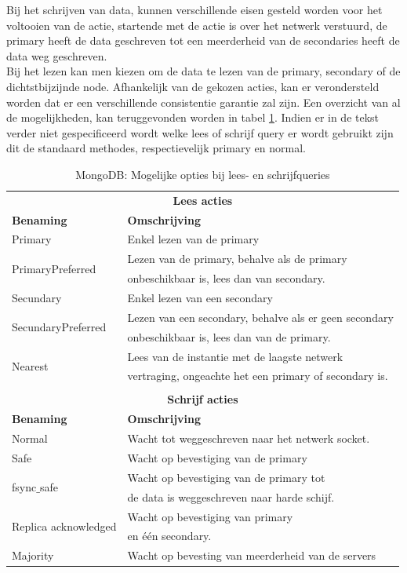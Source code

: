 Bij het schrijven van data, kunnen verschillende eisen gesteld worden voor het voltooien van de actie, startende met de actie is over het netwerk verstuurd, de primary heeft de data geschreven tot een meerderheid van de secondaries heeft de data weg geschreven. \\ Bij het lezen kan men kiezen om de data te lezen van de primary, secondary of de dichtstbijzijnde node. Afhankelijk van de gekozen acties, kan er verondersteld worden dat er een verschillende consistentie garantie zal zijn. Een overzicht van al de mogelijkheden, kan teruggevonden worden in tabel \ref{table:mongodb-query-opties}. Indien er in de tekst verder niet gespecificeerd wordt welke lees of schrijf query er wordt gebruikt zijn dit de standaard methodes, respectievelijk primary en normal. 

\begin{table}[ht!]
	\centering
	\begin{tabular}{l|l}
		\multicolumn{2}{c}{\textbf{Lees acties}} \\ 
		\textbf{Benaming} & \textbf{Omschrijving} \\ \hline
		Primary & Enkel lezen van de primary \\
		\multirow{2}[1]{*}{PrimaryPreferred} & Lezen van de primary, behalve als de primary  \\
		& onbeschikbaar is, lees dan van secondary. \\
		Secundary & Enkel lezen van een secondary \\
		\multirow{2}[1]{*}{SecundaryPreferred} & Lezen van een secondary, behalve als er geen secondary  \\
				& onbeschikbaar is, lees dan van de primary. \\
		\multirow{2}[1]{*}{Nearest} & Lees van de instantie met de laagste netwerk \\
				& vertraging, ongeachte het een primary of secondary is. \\
		\multicolumn{2}{c}{\textbf{}} \\ 		
		
		\multicolumn{2}{c}{\textbf{Schrijf acties}} \\ 
		\textbf{Benaming} & \textbf{Omschrijving} \\ \hline
		Normal & Wacht tot weggeschreven naar het netwerk socket. \\
		\multirow{1}[1]{*}{Safe} & Wacht op bevestiging van de primary    \\
		
		\multirow{2}[1]{*}{fsync$\_$safe} & Wacht op bevestiging van de primary tot  \\
				& de data is weggeschreven naar harde schijf.  \\
		\multirow{2}[1]{*}{Replica acknowledged} & Wacht op bevestiging van primary  \\
				& en één secondary. \\
		\multirow{1}[1]{*}{Majority} & Wacht op bevesting van meerderheid van de servers  \\
	\end{tabular}
	\caption{MongoDB: Mogelijke opties bij lees- en schrijfqueries}
	\label{table:mongodb-query-opties}
\end{table}


